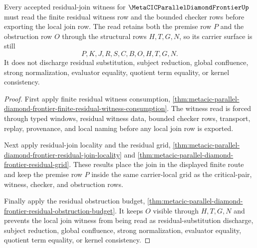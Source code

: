 \begin{theorem}
\label{thm:metacic-parallel-diamond-residual-join-witness-locality}
Every accepted residual-join witness for
$\MetaCICParallelDiamondFrontierUp$ must read the finite residual witness row
and the bounded checker rows before exporting the local join row. The read
retains both the premise row $P$ and the obstruction row $O$ through the
structural rows $H,T,G,N$, so its carrier surface is still
$$
P,K,J,R,S,C,B,O,H,T,G,N .
$$
It does not discharge residual substitution, subject reduction, global
confluence, strong normalization, evaluator equality, quotient term equality,
or kernel consistency.
\end{theorem}
\begin{proof}
First apply finite residual witness consumption,
\autoref{thm:metacic-parallel-diamond-frontier-finite-residual-witness-consumption}.
The witness read is forced through typed windows, residual witness data,
bounded checker rows, transport, replay, provenance, and local naming before
any local join row is exported.

Next apply residual-join locality and the residual grid,
\autoref{thm:metacic-parallel-diamond-frontier-residual-join-locality} and
\autoref{thm:metacic-parallel-diamond-frontier-residual-grid}. These results
place the join in the displayed finite route and keep the premise row $P$
inside the same carrier-local grid as the critical-pair, witness, checker, and
obstruction rows.

Finally apply the residual obstruction budget,
\autoref{thm:metacic-parallel-diamond-frontier-residual-obstruction-budget}.
It keeps $O$ visible through $H,T,G,N$ and prevents the local join witness from
being read as residual-substitution discharge, subject reduction, global
confluence, strong normalization, evaluator equality, quotient term equality,
or kernel consistency.
\end{proof}
